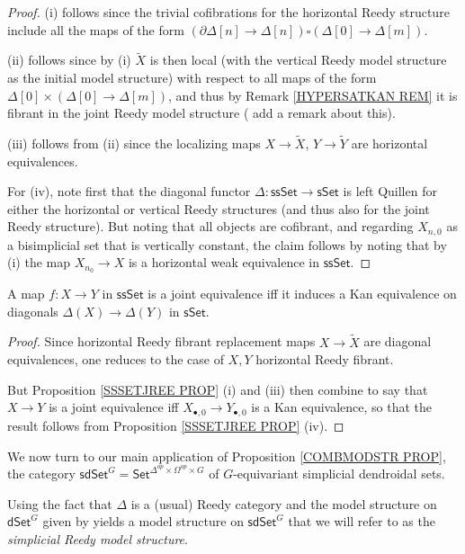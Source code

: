 \documentclass[a4paper,10p,draft]{article}%
\numberwithin{equation}{section}%
\begin{document}
\begin{proof}
(i) follows since the trivial cofibrations for the horizontal Reedy structure include all the maps of the form
$(\partial \Delta[n] \to \Delta[n]) \square (\Delta[0] \to \Delta[m])$.

(ii) follows since by (i) $\tilde{X}$ is then local
(with the vertical Reedy model structure as the initial model structure)
with respect to all maps of the form
$\Delta[0] \times (\Delta[0] \to \Delta[m])$,
and thus by Remark \ref{HYPERSATKAN REM}
it is fibrant in the joint Reedy model structure ({\color{blue} add a remark about this}).

(iii) follows from (ii) since the localizing maps 
$X \to \tilde{X}$, $Y \to \tilde{Y}$
are horizontal equivalences.

For (iv), note first that the diagonal functor
$\Delta \colon \mathsf{ssSet} \to \mathsf{sSet}$
is left Quillen for either the horizontal or vertical Reedy structures (and thus also for the joint Reedy structure). But noting that all objects are cofibrant, and regarding 
$X_{n,0}$ as a bisimplicial set that is vertically constant, the claim
follows by noting that by (i) the map
$X_{n_0} \to X$ is a horizontal weak equivalence in $\mathsf{ssSet}$.
\end{proof}

\begin{corollary}
	A map $f\colon X \to Y$ in $\mathsf{ssSet}$ is a joint equivalence iff it induces a Kan equivalence on diagonals
	$\Delta(X) \to \Delta(Y)$ in $\mathsf{sSet}$.
\end{corollary}

\begin{proof}
	Since horizontal Reedy fibrant replacement maps
	$X \to \tilde{X}$ are diagonal equivalences, 
	one reduces to the case of $X,Y$ horizontal Reedy fibrant.
	
	But Proposition \ref{SSSETJREE PROP} (i) and (iii) then combine to say that $X \to Y$ is a joint equivalence iff
	$X_{\bullet,0} \to Y_{\bullet,0}$ is a Kan equivalence, 
	so that the result follows from Proposition \ref{SSSETJREE PROP} (iv).
\end{proof}


We now turn to our main application of Proposition \ref{COMBMODSTR PROP}, the category 
$\mathsf{sdSet}^G = \mathsf{Set}^{\Delta^{op} \times \Omega^{op} \times G}$
of $G$-equivariant simplicial dendroidal sets.

Using the fact that $\Delta$ is a (usual) Reedy category
and the model structure on $\mathsf{dSet}^G$ given by 
\cite[Thm. 2.1]{Per17}
yields a model structure on $\mathsf{sdSet}^G$
that we will refer to as the \textit{simplicial Reedy model structure}.
\end{document}
